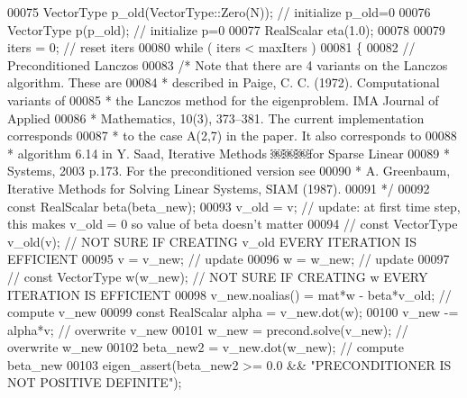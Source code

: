 \begin{DoxyCode}
00075             VectorType p\_old(VectorType::Zero(N)); \textcolor{comment}{// initialize p\_old=0}
00076             VectorType p(p\_old); \textcolor{comment}{// initialize p=0}
00077             RealScalar eta(1.0);
00078                         
00079             iters = 0; \textcolor{comment}{// reset iters}
00080             \textcolor{keywordflow}{while} ( iters < maxIters )
00081             \{
00082                 \textcolor{comment}{// Preconditioned Lanczos}
00083                 \textcolor{comment}{/* Note that there are 4 variants on the Lanczos algorithm. These are}
00084 \textcolor{comment}{                 * described in Paige, C. C. (1972). Computational variants of}
00085 \textcolor{comment}{                 * the Lanczos method for the eigenproblem. IMA Journal of Applied}
00086 \textcolor{comment}{                 * Mathematics, 10(3), 373–381. The current implementation corresponds }
00087 \textcolor{comment}{                 * to the case A(2,7) in the paper. It also corresponds to }
00088 \textcolor{comment}{                 * algorithm 6.14 in Y. Saad, Iterative Methods ￼￼￼for Sparse Linear}
00089 \textcolor{comment}{                 * Systems, 2003 p.173. For the preconditioned version see }
00090 \textcolor{comment}{                 * A. Greenbaum, Iterative Methods for Solving Linear Systems, SIAM (1987).}
00091 \textcolor{comment}{                 */}
00092                 \textcolor{keyword}{const} RealScalar beta(beta\_new);
00093                 v\_old = v; \textcolor{comment}{// update: at first time step, this makes v\_old = 0 so value of beta doesn't
       matter}
00094 \textcolor{comment}{//                const VectorType v\_old(v); // NOT SURE IF CREATING v\_old EVERY ITERATION IS EFFICIENT}
00095                 v = v\_new; \textcolor{comment}{// update}
00096                 w = w\_new; \textcolor{comment}{// update}
00097 \textcolor{comment}{//                const VectorType w(w\_new); // NOT SURE IF CREATING w EVERY ITERATION IS EFFICIENT}
00098                 v\_new.noalias() = mat*w - beta*v\_old; \textcolor{comment}{// compute v\_new}
00099                 \textcolor{keyword}{const} RealScalar alpha = v\_new.dot(w);
00100                 v\_new -= alpha*v; \textcolor{comment}{// overwrite v\_new}
00101                 w\_new = precond.solve(v\_new); \textcolor{comment}{// overwrite w\_new}
00102                 beta\_new2 = v\_new.dot(w\_new); \textcolor{comment}{// compute beta\_new}
00103                 eigen\_assert(beta\_new2 >= 0.0 && \textcolor{stringliteral}{"PRECONDITIONER IS NOT POSITIVE DEFINITE"});

\end{DoxyCode}
